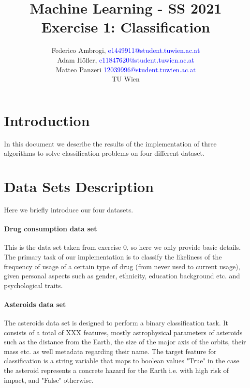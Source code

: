 \documentclass{article}
\begin{document}
\title{ Machine Learning - SS 2021 \\ Exercise 1: Classification }


	\author{Federico Ambrogi, \textcolor{blue} {e1449911@student.tuwien.ac.at } \\
	Adam Höfler, \textcolor{blue} {e11847620@student.tuwien.ac.at } \\
	Matteo Panzeri \textcolor{blue}{12039996@student.tuwien.ac.at } \\
    TU Wien }






\maketitle
\setcounter{tocdepth}{2}
\tableofcontents

\section*{Introduction}
In this document we describe the results of the implementation of three algorithms to solve classification problems on four different dataset. 



\section{Data Sets Description}
Here we briefly introduce our four datasets.
\paragraph{Drug consumption data set} This is the data set taken from exercise 0, so here we only provide basic details. The primary task of our implementation is to classify the likeliness of the frequency of usage of a certain type of drug (from never used to current usage), given personal aspects such as gender, ethnicity, education background etc. and psychological traits.  

\paragraph{Asteroids data set} 
The asteroids data set is designed to perform a binary classification task. It consists of a total of {\color{red} XXX } features, mostly astrophysical parameters of asteroids such as the distance from the Earth, the size of the major axis of the orbits, their mass etc. as well metadata regarding their name. The target feature for classification is a string variable that maps to boolean values "True" in the case the asteroid represents a concrete hazard for the Earth i.e. with high risk of impact, and "False" otherwise.
\end{document}
